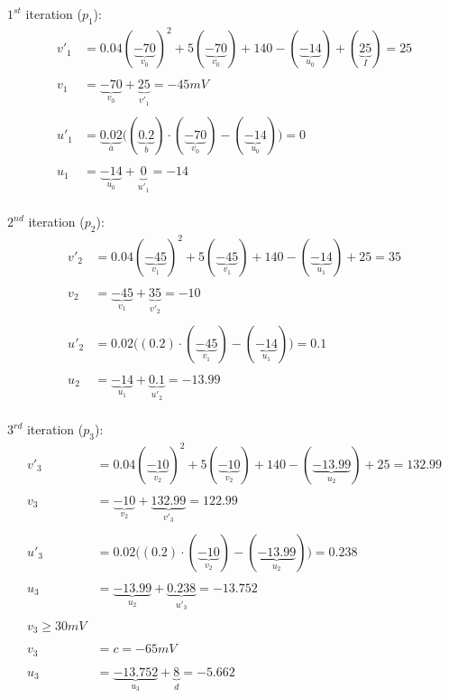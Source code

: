 \documentclass[12pt]{scrreprt}
\begin{document}
$1^{st}$ iteration ($p_1$):
\begin{align} \label{eq:1.5}
v'_{1} &= 0.04(\underbrace{-70}_{v_0})^2 + 5(\underbrace{-70}_{v_0}) + 140 - (\underbrace{-14}_{u_0}) + (\underbrace{25}_I) = 25 \nonumber \\
\nonumber \\
v_1 &= \underbrace{-70}_{v_0} + \underbrace{25}_{v'_{1}} = -45 mV \nonumber \\
\nonumber \\
u'_{1} &= \underbrace{0.02}_a\big((\underbrace{0.2}_b) \cdot (\underbrace{-70}_{v_0}) - (\underbrace{-14}_{u_0})\big) = 0 \nonumber \\
\nonumber \\
u_1 &= \underbrace{-14}_{u_0} + \underbrace{0}_{u'_{1}} = -14
\nonumber \\
\end{align}

$2^{nd}$ iteration ($p_2$):
\begin{align} \label{eq:1.6}
v'_{2} &= 0.04(\underbrace{-45}_{v_1})^2 + 5(\underbrace{-45}_{v_1}) + 140 - (\underbrace{-14}_{u_1}) + 25 = 35 \nonumber \\
\nonumber \\
v_2 &= \underbrace{-45}_{v_1} + \underbrace{35}_{v'_{2}} = -10 \nonumber \\
\nonumber \\
u'_{2} &= 0.02\big((0.2) \cdot (\underbrace{-45}_{v_1})-(\underbrace{-14}_{u_1})\big) = 0.1 \nonumber \\
\nonumber \\
u_2 &= \underbrace{-14}_{u_1} + \underbrace{0.1}_{u'_{2}} = -13.99  \nonumber \\
\end{align}

$3^{rd}$ iteration ($p_3$):
\begin{align} \label{eq:1.7}
v'_{3} &= 0.04(\underbrace{-10}_{v_2})^2 + 5(\underbrace{-10}_{v_2}) + 140 - (\underbrace{-13.99}_{u_2}) + 25 = 132.99 \nonumber \\
\nonumber \\
v_3 &= \underbrace{-10}_{v_2} + \underbrace{132.99}_{v'_3} = 122.99 \nonumber \\
\nonumber \\
u'_{3} &= 0.02\big((0.2) \cdot (\underbrace{-10}_{v_2})-(\underbrace{-13.99}_{u_2})\big) = 0.238 \nonumber \\
\nonumber \\
u_3 &= \underbrace{-13.99}_{u_2} + \underbrace{0.238}_{u'_3} = -13.752 \nonumber \\
\nonumber \\
v_3 \geq 30mV \nonumber \\
\nonumber \\
v_3 &= c = -65 mV \nonumber \\ 
\nonumber \\
u_3 &= \underbrace{-13.752}_{u_3} + \underbrace{8}_d = -5.662 \nonumber \\
\end{align}
\end{document}
